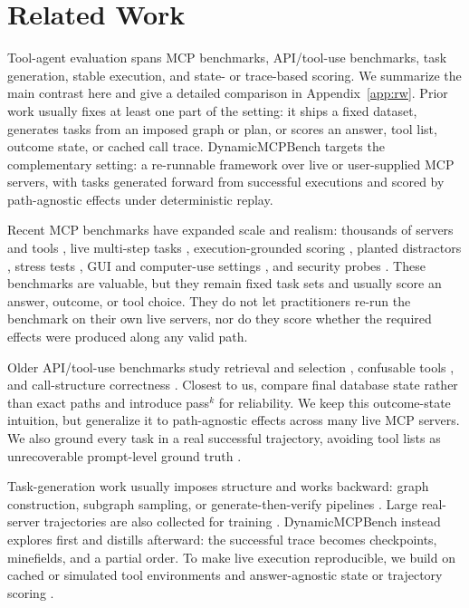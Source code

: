 \section{Related Work}
\label{sec:related}

Tool-agent evaluation spans MCP benchmarks, API/tool-use benchmarks, task
generation, stable execution, and state- or trace-based scoring. We summarize
the main contrast here and give a detailed comparison in Appendix~\ref{app:rw}.
Prior work usually fixes at least one part of the setting: it ships a fixed
dataset, generates tasks from an imposed graph or plan, or scores an answer,
tool list, outcome state, or cached call trace. DynamicMCPBench targets the
complementary setting: a re-runnable framework over live or user-supplied MCP
servers, with tasks generated forward from successful executions and scored by
path-agnostic effects under deterministic replay.

Recent MCP benchmarks have expanded scale and realism: thousands of servers
and tools \citep{fan2025mcptoolbench++, mo2025livemcpbench, lei2025mcpverse},
live multi-step tasks \citep{wang2025mcp}, execution-grounded scoring
\citep{servers25mcp, gao2025mcp}, planted distractors \citep{bandi2026mcp},
stress tests \citep{wu2025mcpmark, yin2025livemcp, guo2026mcp}, GUI and
computer-use settings \citep{yan2025mcpworld, jia2025osworld}, and security
probes \citep{zhang2025mcp}. These benchmarks are valuable, but they remain
fixed task sets and usually score an answer, outcome, or tool choice. They do
not let practitioners re-run the benchmark on their own live servers, nor do
they score whether the required effects were produced along any valid path.

Older API/tool-use benchmarks study retrieval and selection
\citep{patil2024gorilla, qin2024toolllm}, confusable tools
\citep{huang2024metatool}, and call-structure correctness
\citep{patil2025berkeley}. Closest to us, \citet{yao2024tau} compare final
database state rather than exact paths and introduce pass$^k$ for reliability.
We keep this outcome-state intuition, but generalize it to path-agnostic
effects across many live MCP servers. We also ground every task in a real
successful trajectory, avoiding tool lists as unrecoverable prompt-level ground
truth \citep{qin2024toolllm}.

Task-generation work usually imposes structure and works backward: graph
construction, subgraph sampling, or generate-then-verify pipelines
\citep{shen2024taskbench, guo2026unitoolbench, liu2025mcpeval,
shi2025taskcraft}. Large real-server trajectories are also collected for
training \citep{xu2025toucan}. DynamicMCPBench instead explores first and
distills afterward: the successful trace becomes checkpoints, minefields, and a
partial order. To make live execution reproducible, we build on cached or
simulated tool environments
\citep{guo2024stabletoolbench, guo2025stabletoolbench, cheng2025travelbench}
and answer-agnostic state or trajectory scoring
\citep{lu2025toolsandbox, barres2025tau, kim2025beyond, zeng2026logigen,
chuang2026toward}.

